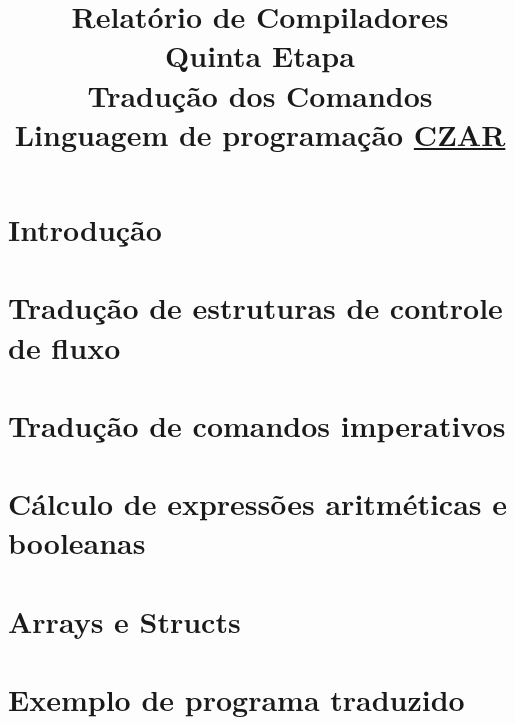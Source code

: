 \documentclass[12pt,oneside,a4paper,english]{abntex2}
\title{Relatório de Compiladores\\Quinta Etapa\\Tradução dos Comandos\\Linguagem de programação \underline{CZAR}}
\begin{document}
\frenchspacing %

\imprimirfolhaderosto

\tableofcontents

\textual

\chapter{Introdução}
\label{chap:introducao}
	

\chapter{Tradução de estruturas de controle de fluxo}
\label{chap:traducao-estruturas-controle}
	

\chapter{Tradução de comandos imperativos}
\label{chap:traducao-comandos-imperativos}
	
	
\chapter{Cálculo de expressões aritméticas e booleanas}
\label{chap:calculo-expressoes}
	

\chapter{Arrays e Structs}
\label{chap:arrays-structs}
	

\chapter{Exemplo de programa traduzido}
\label{chap:caracteristicas-gerais}
	

\postextual


\end{document}
